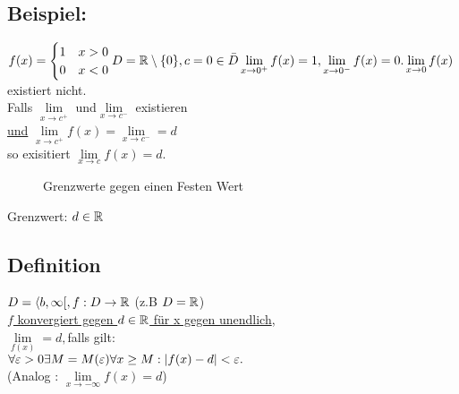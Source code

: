 \subsection[Beispiel]{Beispiel:}
$f(x) = \begin{cases}
1 & x>0\\
0 & x<0
\end{cases}
D = \mathbb{R} \setminus \{0\}, c = 0 \in \bar{D}\\
\lim\limits_{x \rightarrow 0^+} f(x) = 1, \lim\limits_{x \rightarrow 0^-} f(x) = 0.\\
\lim\limits_{x \rightarrow 0} f(x)$ existiert nicht.\\
Falls $\lim\limits_{x \rightarrow c^+}$ und$ \lim\limits_{x \rightarrow c^-}$ existieren\\
\underline{und} $\lim\limits_{x \rightarrow c^+} f(x) = \lim\limits_{x \rightarrow c^-} = d$\\
so exisitiert $\lim\limits_{x \rightarrow c} f(x) = d$.
\begin{figure}[h!]
\begin{minipage}[t]{\textwidth}
\begin{minipage}[t]{.5\textwidth}
\end{minipage}%
\begin{minipage}[t]{.5\textwidth}
\end{minipage}
\end{minipage}
\caption{Grenzwerte gegen einen Festen Wert}
\end{figure}
Grenzwert: $d \in \mathbb{R}$
\subsection{Definition}
$D = \langle b, \infty[ , f : D \rightarrow \mathbb{R}$
\hspace*{3cm} (z.B $D=\mathbb{R}$)\\
\underline{$f$ konvergiert gegen $d \in \mathbb{R}$ für x gegen unendlich},\\
$\lim\limits_{f(x)} = d, $falls gilt:\\
$\forall \varepsilon > 0 \exists M = M(\varepsilon) \forall x \geq M: \lvert f(x) - d \rvert < \varepsilon.$\\
(Analog : $\lim\limits_{x \rightarrow - \infty}f(x) = d$)
